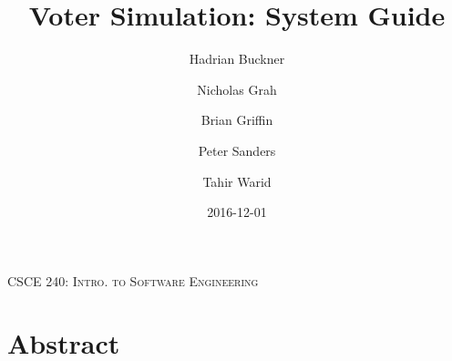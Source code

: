 \documentclass[letterpaper]{report}
\title{Voter Simulation: System Guide}
\author{Hadrian Buckner \and Nicholas Grah \and Brian Griffin \and Peter Sanders \and Tahir Warid}
\date{2016-12-01}
\begin{document}
\begin{titlepage}

{\centering
  {\scshape\Huge CSCE 240: Intro. to Software Engineering\par}
  \vspace{1cm}
  {\scshape\LARGE \thetitle \par}
  \vspace{1cm}
  {\Large \theauthor \par}
  \vspace{1cm}
  {\scshape\large \thedate \par}
}

\vfill
\section*{Abstract}

\vfill
\end{titlepage}
\end{document}
